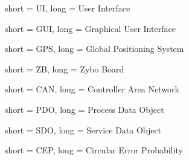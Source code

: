 {
	short = {UI},
	long = {User Interface}
}

{
	short = {GUI},
	long = {Graphical User Interface}
}

{
	short = {GPS},
	long = {Global Positioning System}
}

{
	short = {ZB},
	long = {Zybo Board}
}

{
	short = {CAN},
	long = {Controller Area Network}
}

{
	short = {PDO},
	long = {Process Data Object}
}

{
	short = {SDO},
	long = {Service Data Object}
}

{
	short = {CEP},
	long = {Circular Error Probability}
}

